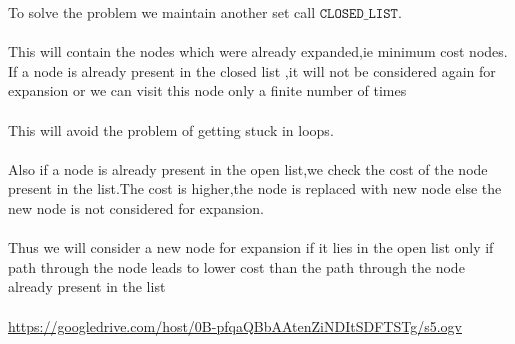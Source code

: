 \documentclass[fontsize=12pt, %
                             paper=a4, %
                             oneside, %
                             captions=tableheading,
                             index=totoc,
                             hyperref]{labbook}
\newcommand{\vurl}[1]{\url{#1}}
\begin{document}
To solve the problem we maintain another set call $\texttt{CLOSED\_LIST}$.
\\\\
This will contain the nodes which were already expanded,ie minimum cost nodes.
If a node is already present in the closed list ,it will not be considered
again for expansion or we can visit this node only a finite number of times
\\\\
This will avoid the problem of getting stuck in loops.
\\\\
Also if a node is already present in the open list,we check the cost of the node present
in the list.The cost is higher,the node is replaced with new node else the new node
is not considered for expansion.
\\\\
Thus we will consider a new node for expansion if it lies in the open list
only if path through the node leads to lower cost than the path through the node
already present in the list
\\\\
\vurl{https://googledrive.com/host/0B-pfqaQBbAAtenZiNDItSDFTSTg/s5.ogv}  
\end{document}
